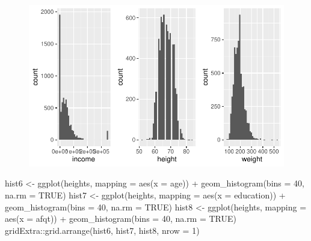 \documentclass[
  letterpaper,
  DIV=11,
  numbers=noendperiod]{scrartcl}
\newenvironment{Shaded}{\begin{snugshade}}{\end{snugshade}}
\newcommand{\AttributeTok}[1]{\textcolor[rgb]{0.40,0.45,0.13}{#1}}
\newcommand{\ConstantTok}[1]{\textcolor[rgb]{0.56,0.35,0.01}{#1}}
\newcommand{\DecValTok}[1]{\textcolor[rgb]{0.68,0.00,0.00}{#1}}
\newcommand{\FunctionTok}[1]{\textcolor[rgb]{0.28,0.35,0.67}{#1}}
\newcommand{\NormalTok}[1]{\textcolor[rgb]{0.00,0.23,0.31}{#1}}
\newcommand{\OtherTok}[1]{\textcolor[rgb]{0.00,0.23,0.31}{#1}}
\newcommand{\SpecialCharTok}[1]{\textcolor[rgb]{0.37,0.37,0.37}{#1}}
\begin{document}
\begin{figure}[H]

{\centering \includegraphics{EDA_files/figure-pdf/unnamed-chunk-16-1.pdf}

}

\end{figure}

\begin{Shaded}
\begin{Highlighting}[]
\NormalTok{hist6 }\OtherTok{\textless{}{-}} \FunctionTok{ggplot}\NormalTok{(heights, }\AttributeTok{mapping =} \FunctionTok{aes}\NormalTok{(}\AttributeTok{x =}\NormalTok{ age)) }\SpecialCharTok{+}
  \FunctionTok{geom\_histogram}\NormalTok{(}\AttributeTok{bins =} \DecValTok{40}\NormalTok{, }\AttributeTok{na.rm =} \ConstantTok{TRUE}\NormalTok{)}
\NormalTok{hist7 }\OtherTok{\textless{}{-}} \FunctionTok{ggplot}\NormalTok{(heights, }\AttributeTok{mapping =} \FunctionTok{aes}\NormalTok{(}\AttributeTok{x =}\NormalTok{ education)) }\SpecialCharTok{+}
  \FunctionTok{geom\_histogram}\NormalTok{(}\AttributeTok{bins =} \DecValTok{40}\NormalTok{, }\AttributeTok{na.rm =} \ConstantTok{TRUE}\NormalTok{)}
\NormalTok{hist8 }\OtherTok{\textless{}{-}} \FunctionTok{ggplot}\NormalTok{(heights, }\AttributeTok{mapping =} \FunctionTok{aes}\NormalTok{(}\AttributeTok{x =}\NormalTok{ afqt)) }\SpecialCharTok{+}
  \FunctionTok{geom\_histogram}\NormalTok{(}\AttributeTok{bins =} \DecValTok{40}\NormalTok{, }\AttributeTok{na.rm =} \ConstantTok{TRUE}\NormalTok{)}
\NormalTok{gridExtra}\SpecialCharTok{::}\FunctionTok{grid.arrange}\NormalTok{(hist6, hist7, hist8, }\AttributeTok{nrow =} \DecValTok{1}\NormalTok{)}
\end{Highlighting}
\end{Shaded}
\end{document}
